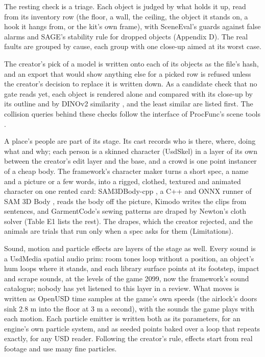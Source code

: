 The resting check is a triage. Each object is judged by what holds it up, read from its inventory row (the floor, a wall, the ceiling, the object it stands on, a hook it hangs from, or the kit's own frame), with SceneEval's guards against false alarms \citep{tam2025sceneeval} and SAGE's stability rule for dropped objects \citep{xia2026sage} (Appendix D). The real faults are grouped by cause, each group with one close-up aimed at its worst case.

The creator's pick of a model is written onto each of its objects as the file's hash, and an export that would show anything else for a picked row is refused unless the creator's decision to replace it is written down. As a candidate check that no gate reads yet, each object is rendered alone and compared with its close-up by its outline and by DINOv2 similarity \citep{oquab2023dinov2}, and the least similar are listed first. The collision queries behind these checks follow the interface of ProcFunc's scene tools \citep{raistrick2026procfunc}.

A place's people are part of its stage. Its cast records who is there, where, doing what and why; each person is a skinned character (UsdSkel) in a layer of its own between the creator's edit layer and the base, and a crowd is one point instancer of a cheap body. The framework's character maker turns a short spec, a name and a picture or a few words, into a rigged, clothed, textured and animated character on one rented card: SAM3DBody-cpp \citep{sam3dbodycpp}, a C++ and ONNX runner of SAM 3D Body \citep{yang2026sam3dbody}, reads the body off the picture, Kimodo \citep{rempe2026kimodo} writes the clips from sentences, and GarmentCode's sewing patterns \citep{korosteleva2023garmentcode} are draped by Newton's cloth solver \citep{newton} (Table E1 lists the rest). The drapes, which the creator rejected, and the animals are trials that run only when a spec asks for them (Limitations).

Sound, motion and particle effects are layers of the stage as well. Every sound is a UsdMedia spatial audio prim: room tones loop without a position, an object's hum loops where it stands, and each library surface points at its footstep, impact and scrape sounds, at the levels of the game 2099, now the framework's sound catalogue; nobody has yet listened to this layer in a review. What moves is written as OpenUSD time samples at the game's own speeds (the airlock's doors sink 2.8 m into the floor at 3 m a second), with the sounds the game plays with each motion. Each particle emitter is written both as its parameters, for an engine's own particle system, and as seeded points baked over a loop that repeats exactly, for any USD reader. Following the creator's rule, effects start from real footage and use many fine particles.

